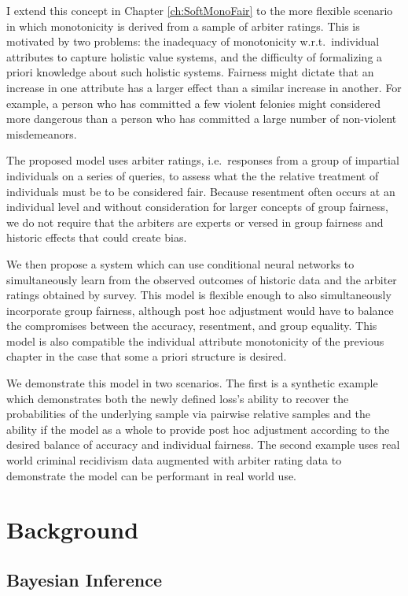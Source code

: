 I extend this concept in Chapter \ref{ch:SoftMonoFair} to the more flexible scenario in which monotonicity is derived from a sample of arbiter ratings. This is motivated by two problems: the inadequacy of monotonicity w.r.t.\ individual attributes to capture holistic value systems, and the difficulty of formalizing a priori knowledge about such holistic systems. Fairness might dictate that an increase in one attribute has a larger effect than a similar increase in another.  For example, a person who has committed a few violent felonies might considered more dangerous than a person who has committed a large number of non-violent misdemeanors.

The proposed model uses arbiter ratings, i.e.\ responses from a group of impartial individuals on a series of queries, to assess what the the relative treatment of individuals must be to be considered fair.  Because resentment often occurs at an individual level and without consideration for larger concepts of group fairness, we do not require that the arbiters are experts or versed in group fairness and historic effects that could create bias.

We then propose a system which can use conditional neural networks to simultaneously learn from the observed outcomes of historic data and the arbiter ratings obtained by survey.  This model is flexible enough to also simultaneously incorporate group fairness, although post hoc adjustment would have to balance the compromises between the accuracy, resentment, and group equality.  This model is also compatible the individual attribute monotonicity of the previous chapter in the case that some a priori structure is desired.

We demonstrate this model in two scenarios.  The first is a synthetic example which demonstrates both the newly defined loss's ability to recover the probabilities of the underlying sample via pairwise relative samples and the ability if the model as a whole to provide post hoc adjustment according to the desired balance of accuracy and individual fairness.  The second example uses real world criminal recidivism data augmented with arbiter rating data to demonstrate the model can be performant in real world use.

\section{Background}

    \subsection{Bayesian Inference} \label{sec:intro_bayes}
    
